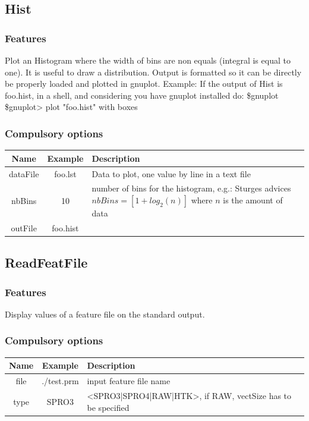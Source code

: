 \documentclass[a4paper]{article}
\begin{document}
\subsection{Hist}
\subsubsection{Features}
Plot an Histogram where the width of bins are non equals (integral is equal to one). It is useful to draw a distribution.
Output is formatted so it can be directly be properly loaded and plotted in gnuplot. 
Example:
    If the output of Hist is foo.hist, in a shell, and considering you have gnuplot installed do:
    \$gnuplot
    \$gnuplot> plot "foo.hist" with boxes
 
\subsubsection{Compulsory options}

\begin{tabular}{|c|c||p{8cm}|}
\hline Name & Example & Description\\
\hline
\hline dataFile & foo.lst & Data to plot, one value by line in a text file\\
\hline nbBins & 10 & number of bins for the histogram, e.g.: Sturges advices $nbBins=[1+log_2(n)]$ where $n$ is the amount of data\\
\hline outFile & foo.hist & \\
\hline
\end{tabular}

\subsection{ReadFeatFile}
\subsubsection{Features}
Display values of a feature file on the standard output.

\subsubsection{Compulsory options}

\begin{tabular}{|c|c||p{8cm}|}
\hline Name & Example & Description\\
\hline
\hline file & ./test.prm & input feature file name\\
\hline type & SPRO3 & <SPRO3|SPRO4|RAW|HTK>, if RAW, vectSize has to be specified\\
\hline
\end{tabular}
\end{document}
